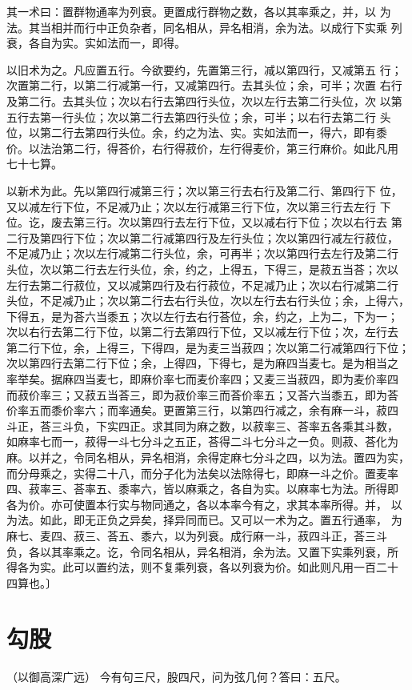 \documentclass[a4paper,12pt,UTF8,twoside]{ctexbook}
\begin{document}
其一术曰：置群物通率为列衰。更置成行群物之数，各以其率乘之，并，以 为法。其当相并而行中正负杂者，同名相从，异名相消，余为法。以成行下实乘 列衰，各自为实。实如法而一，即得。

以旧术为之。凡应置五行。今欲要约，先置第三行，减以第四行，又减第五 行；次置第二行，以第二行减第一行，又减第四行。去其头位；余，可半；次置 右行及第二行。去其头位；次以右行去第四行头位，次以左行去第二行头位，次 以第五行去第一行头位；次以第二行去第四行头位；余，可半；以右行去第二行 头位，以第二行去第四行头位。余，约之为法、实。实如法而一，得六，即有黍 价。以法治第二行，得荅价，右行得菽价，左行得麦价，第三行麻价。如此凡用 七十七算。

以新术为此。先以第四行减第三行；次以第三行去右行及第二行、第四行下 位，又以减左行下位，不足减乃止；次以左行减第三行下位，次以第三行去左行 下位。讫，废去第三行。次以第四行去左行下位，又以减右行下位；次以右行去 第二行及第四行下位；次以第二行减第四行及左行头位；次以第四行减左行菽位， 不足减乃止；次以左行减第二行头位，余，可再半；次以第四行去左行及第二行 头位，次以第二行去左行头位，余，约之，上得五，下得三，是菽五当荅；次以 左行去第二行菽位，又以减第四行及右行菽位，不足减乃止；次以右行减第二行 头位，不足减乃止；次以第二行去右行头位，次以左行去右行头位；余，上得六， 下得五，是为荅六当黍五；次以左行去右行荅位，余，约之，上为二，下为一； 次以右行去第二行下位，以第二行去第四行下位，又以减左行下位；次，左行去 第二行下位，余，上得三，下得四，是为麦三当菽四；次以第二行减第四行下位； 次以第四行去第二行下位；余，上得四，下得七，是为麻四当麦七。是为相当之 率举矣。据麻四当麦七，即麻价率七而麦价率四；又麦三当菽四，即为麦价率四 而菽价率三；又菽五当荅三，即为菽价率三而荅价率五；又荅六当黍五，即为荅 价率五而黍价率六；而率通矣。更置第三行，以第四行减之，余有麻一斗，菽四 斗正，荅三斗负，下实四正。求其同为麻之数，以菽率三、荅率五各乘其斗数， 如麻率七而一，菽得一斗七分斗之五正，荅得二斗七分斗之一负。则菽、荅化为 麻。以并之，令同名相从，异名相消，余得定麻七分斗之四，以为法。置四为实， 而分母乘之，实得二十八，而分子化为法矣以法除得七，即麻一斗之价。置麦率 四、菽率三、荅率五、黍率六，皆以麻乘之，各自为实。以麻率七为法。所得即 各为价。亦可使置本行实与物同通之，各以本率今有之，求其本率所得。并， 以为法。如此，即无正负之异矣，择异同而已。又可以一术为之。置五行通率， 为麻七、麦四、菽三、荅五、黍六，以为列衰。成行麻一斗，菽四斗正，荅三斗 负，各以其率乘之。讫，令同名相从，异名相消，余为法。又置下实乘列衰，所 得各为实。此可以置约法，则不复乘列衰，各以列衰为价。如此则凡用一百二十 四算也。〕 

\chapter{勾股}
（以御高深广远） 今有句三尺，股四尺，问为弦几何？答曰：五尺。
\end{document}
